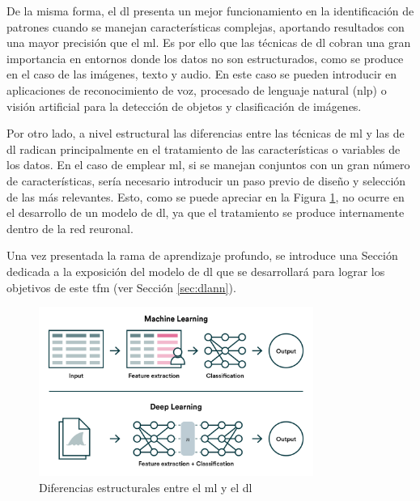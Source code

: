 \vspace{3mm}

De la misma forma, el \gls{dl} presenta un mejor funcionamiento en la identificación de patrones cuando se manejan características complejas, aportando resultados con una mayor precisión que el \gls{ml}. Es por ello que las técnicas de \gls{dl} cobran una gran importancia en entornos donde los datos no son estructurados, como se produce en el caso de las imágenes, texto y audio. En este caso se pueden introducir en aplicaciones de reconocimiento de voz, procesado de lenguaje natural (\gls{nlp}) o visión artificial para la detección de objetos y clasificación de imágenes. \cite{iageeks}

\vspace{3mm}

Por otro lado, a nivel estructural las diferencias entre las técnicas de \gls{ml} y las de \gls{dl} radican principalmente en el tratamiento de las características o variables de los datos. En el caso de emplear \gls{ml}, si se manejan conjuntos con un gran número de características, sería necesario introducir un paso previo de diseño y selección de las más relevantes. Esto, como se puede apreciar en la Figura \ref{fig:features}, no ocurre en el desarrollo de un modelo de \gls{dl}, ya que el tratamiento se produce internamente dentro de la red reuronal. \cite{valohai}

\vspace{3mm}

Una vez presentada la rama de aprendizaje profundo, se introduce una Sección dedicada a la exposición del modelo de \gls{dl} que se desarrollará para lograr los objetivos de este \gls{tfm} (ver Sección \ref{sec:dlann}). 

\vspace{3mm}

\begin{figure}[h!]
    \centering
    \includegraphics[width=0.8\textwidth]{img/teoria/mlvsdl.png}
    \caption{Diferencias estructurales entre el \acrshort{ml} y el \acrshort{dl} \cite{valohai}}
    \label{fig:features}
\end{figure}

